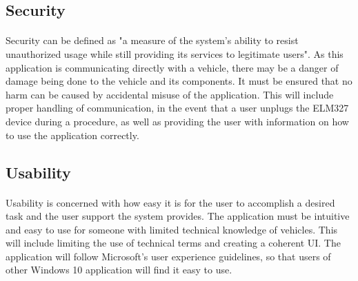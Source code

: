 	\subsection{Security}
		\paragraph{}{
		Security can be defined as "a measure of the system's ability to resist unauthorized usage while still providing its services to legitimate users"\cite{SAinP}. As this application is communicating directly with a vehicle, there may be a danger of damage being done to the vehicle and its components. It must be ensured that no harm can be caused by accidental misuse of the application. This will include proper handling of communication, in the event that a user unplugs the ELM327 device during a procedure, as well as providing the user with information on how to use the application correctly.
		}		
	\subsection{Usability}
		\paragraph{}{
		Usability is concerned with how easy it is for the user to accomplish a desired task and the user support the system provides\cite{SAinP}. The application must be intuitive and easy to use for someone with limited technical knowledge of vehicles. This will include limiting the use of technical terms and creating a coherent UI. The application will follow Microsoft's user experience guidelines, so that users of other Windows 10 application will find it easy to use.
		}
